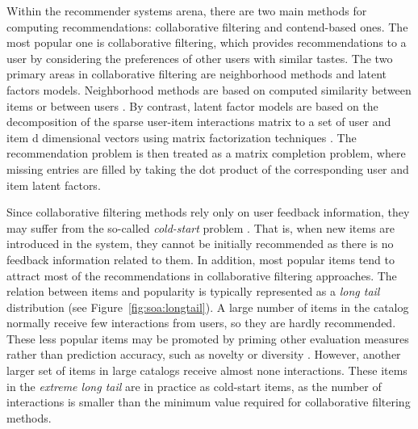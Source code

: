 Within the recommender systems arena, there are two main methods for computing recommendations: collaborative filtering and contend-based ones.
The most popular one is collaborative filtering, which provides recommendations to a user by considering the preferences of other users with similar tastes. 
The two primary areas in collaborative filtering are neighborhood methods and latent factors models. Neighborhood methods are based on computed similarity between items or between users \citep{Sarwar2001}. By contrast, latent factor models are based on the decomposition of the sparse user-item interactions matrix to a set of user and item d dimensional vectors using matrix factorization techniques \citep{Koren2009}. The recommendation problem is then treated as a matrix completion problem, where missing entries are filled by taking the dot product of the corresponding user and item latent factors. %

Since collaborative filtering methods rely only on user feedback information, they may suffer from the so-called \textit{cold-start} problem \citep{Saveski2014}. That is, when new items are introduced in the system, they cannot be initially recommended as there is no feedback information related to them.
In addition, most popular items tend to attract most of the recommendations in collaborative filtering approaches. The relation between items and popularity is typically represented as a \textit{long tail} distribution \citep{anderson2006long} (see Figure~\ref{fig:soa:longtail}). A large number of items in the catalog normally receive few interactions from users, so they are hardly recommended. %
These less popular items may be promoted by priming other evaluation measures rather than prediction accuracy, such as novelty or diversity \citep{abdollahpouri2017controlling}.
However, another larger set of items in large catalogs receive almost none interactions. These items in the \textit{extreme long tail} are in practice as cold-start items, as the number of interactions is smaller than the minimum value required for collaborative filtering methods.

